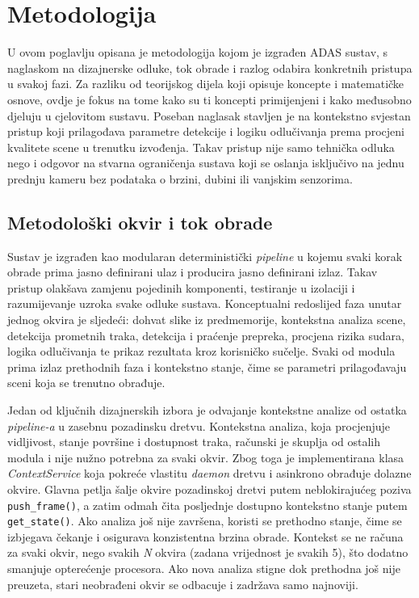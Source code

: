 \chapter{Metodologija}
U ovom poglavlju opisana je metodologija kojom je izgrađen ADAS sustav, s naglaskom na dizajnerske odluke, tok obrade i razlog odabira konkretnih pristupa u svakoj fazi. Za razliku od teorijskog dijela koji opisuje koncepte i matematičke osnove, ovdje je fokus na tome kako su ti koncepti primijenjeni i kako međusobno djeluju u cjelovitom sustavu. Poseban naglasak stavljen je na kontekstno svjestan pristup koji prilagođava parametre detekcije i logiku odlučivanja prema procjeni kvalitete scene u trenutku izvođenja. Takav pristup nije samo tehnička odluka nego i odgovor na stvarna ograničenja sustava koji se oslanja isključivo na jednu prednju kameru bez podataka o brzini, dubini ili vanjskim senzorima.

\section{Metodološki okvir i tok obrade}
Sustav je izgrađen kao modularan deterministički \textit{pipeline} u kojemu svaki korak obrade prima jasno definirani ulaz i producira jasno definirani izlaz. Takav pristup olakšava zamjenu pojedinih komponenti, testiranje u izolaciji i razumijevanje uzroka svake odluke sustava. Konceptualni redoslijed faza unutar jednog okvira je sljedeći: dohvat slike iz predmemorije, kontekstna analiza scene, detekcija prometnih traka, detekcija i praćenje prepreka, procjena rizika sudara, logika odlučivanja te prikaz rezultata kroz korisničko sučelje. Svaki od modula prima izlaz prethodnih faza i kontekstno stanje, čime se parametri prilagođavaju sceni koja se trenutno obrađuje.

Jedan od ključnih dizajnerskih izbora je odvajanje kontekstne analize od ostatka \textit{pipeline-a} u zasebnu pozadinsku dretvu. Kontekstna analiza, koja procjenjuje vidljivost, stanje površine i dostupnost traka, računski je skuplja od ostalih modula i nije nužno potrebna za svaki okvir. Zbog toga je implementirana klasa \textit{ContextService} koja pokreće vlastitu \textit{daemon} dretvu i asinkrono obrađuje dolazne okvire. Glavna petlja šalje okvire pozadinskoj dretvi putem neblokirajućeg poziva \texttt{push\_frame()}, a zatim odmah čita posljednje dostupno kontekstno stanje putem \texttt{get\_state()}. Ako analiza još nije završena, koristi se prethodno stanje, čime se izbjegava čekanje i osigurava konzistentna brzina obrade. Kontekst se ne računa za svaki okvir, nego svakih \textit{N} okvira (zadana vrijednost je svakih 5), što dodatno smanjuje opterećenje procesora. Ako nova analiza stigne dok prethodna još nije preuzeta, stari neobrađeni okvir se odbacuje i zadržava samo najnoviji.

